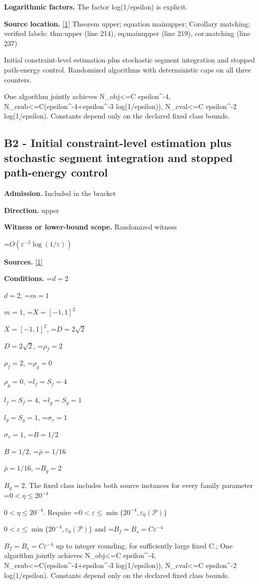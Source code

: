 \documentclass[10pt,a4paper]{article}
\newcommand{\AtlasMath}[1]{\par\begingroup\centering\setbox0=\hbox{$\displaystyle #1$}\ifdim\wd0>1.4\linewidth\typeout{ATLAS WIDE FORMULA: \the\wd0}\fi\ifdim\wd0>\linewidth\resizebox{\linewidth}{!}{\box0}\else\box0\fi\par\endgroup}
\newcommand{\AtlasInlineMath}[1]{\begingroup\setbox0=\hbox{$#1$}\ifdim\wd0>.4\linewidth\endgroup\AtlasMath{#1}\else\endgroup$#1$\fi}
\begin{document}
\textbf{Logarithmic factors.} The factor log(1/epsilon) is explicit.



\textbf{Source location.} \href{https://github.com/WU-Wendao/Colombo/blob/main/colombo_sensorium/Complexity_altas/data/sources/colombo/N10/manuscript.pdf}{[1]} Theorem upper; equation mainupper; Corollary matching; verified labels: thm:upper (line 214), eq:mainupper (line 219), cor:matching (line 237)



Initial constraint-level estimation plus stochastic segment integration and stopped path-energy control. Randomized algorithms with deterministic caps on all three counters.



One algorithm jointly achieves N\_obj<=C epsilon\textasciicircum{}-4, N\_csub<=C(epsilon\textasciicircum{}-4+epsilon\textasciicircum{}-3 log(1/epsilon)), N\_cval<=C epsilon\textasciicircum{}-2 log(1/epsilon). Constants depend only on the declared fixed class bounds.



\subsection{B2 - Initial constraint-level estimation plus stochastic segment integration and stopped path-energy control}


\textbf{Admission.} Included in the bracket



\textbf{Direction.} upper



\textbf{Witness or lower-bound scope.} Randomized witness



\AtlasMath{O(\varepsilon^{-2}\log(1/\varepsilon))}


\textbf{Sources.} \href{https://github.com/WU-Wendao/Colombo/blob/main/colombo_sensorium/Complexity_altas/data/sources/colombo/N10/manuscript.pdf}{[1]}



\textbf{Conditions.} \AtlasInlineMath{d=2}, \AtlasInlineMath{m=1}, \AtlasInlineMath{X=[-1,1]^2}, \AtlasInlineMath{D=2\sqrt2}, \AtlasInlineMath{\rho_f=2}, \AtlasInlineMath{\rho_g=0}, \AtlasInlineMath{l_f=S_f=4}, \AtlasInlineMath{l_g=S_g=1}, \AtlasInlineMath{\sigma_v=1}, \AtlasInlineMath{B=1/2}, \AtlasInlineMath{\bar\rho=1/16}, \AtlasInlineMath{B_g=2}. The fixed class includes both source instances for every family parameter \AtlasInlineMath{0<\eta\le20^{-4}}. Require \AtlasInlineMath{0<\varepsilon\le\min\{20^{-4},\varepsilon_0(\mathcal P)\}} and \AtlasInlineMath{B_f=B_s=C\varepsilon^{-4}} up to integer rounding, for sufficiently large fixed C.; One algorithm jointly achieves N\_obj<=C epsilon\textasciicircum{}-4, N\_csub<=C(epsilon\textasciicircum{}-4+epsilon\textasciicircum{}-3 log(1/epsilon)), N\_cval<=C epsilon\textasciicircum{}-2 log(1/epsilon). Constants depend only on the declared fixed class bounds.
\end{document}
